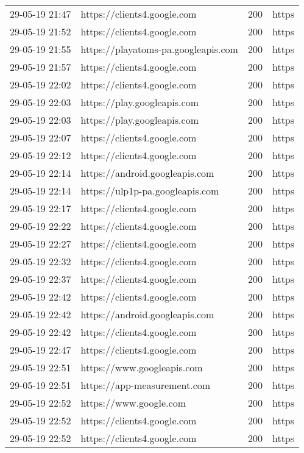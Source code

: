 \begin{longtable}[c]{@{}llll@{}}
    29-05-19 21:47 & https://clients4.google.com & 200 & https \\
    29-05-19 21:52 & https://clients4.google.com & 200 & https \\
    29-05-19 21:55 & https://playatoms-pa.googleapis.com & 200 & https \\
    29-05-19 21:57 & https://clients4.google.com & 200 & https \\
    29-05-19 22:02 & https://clients4.google.com & 200 & https \\
    29-05-19 22:03 & https://play.googleapis.com & 200 & https \\
    29-05-19 22:03 & https://play.googleapis.com & 200 & https \\
    29-05-19 22:07 & https://clients4.google.com & 200 & https \\
    29-05-19 22:12 & https://clients4.google.com & 200 & https \\
    29-05-19 22:14 & https://android.googleapis.com & 200 & https \\
    29-05-19 22:14 & https://ulp1p-pa.googleapis.com & 200 & https \\
    29-05-19 22:17 & https://clients4.google.com & 200 & https \\
    29-05-19 22:22 & https://clients4.google.com & 200 & https \\
    29-05-19 22:27 & https://clients4.google.com & 200 & https \\
    29-05-19 22:32 & https://clients4.google.com & 200 & https \\
    29-05-19 22:37 & https://clients4.google.com & 200 & https \\
    29-05-19 22:42 & https://clients4.google.com & 200 & https \\
    29-05-19 22:42 & https://android.googleapis.com & 200 & https \\
    29-05-19 22:42 & https://clients4.google.com & 200 & https \\
    29-05-19 22:47 & https://clients4.google.com & 200 & https \\
    29-05-19 22:51 & https://www.googleapis.com & 200 & https \\
    29-05-19 22:51 & https://app-measurement.com & 200 & https \\
    29-05-19 22:52 & https://www.google.com & 200 & https \\
    29-05-19 22:52 & https://clients4.google.com & 200 & https \\
    29-05-19 22:52 & https://clients4.google.com & 200 & https \\

\end{longtable}
